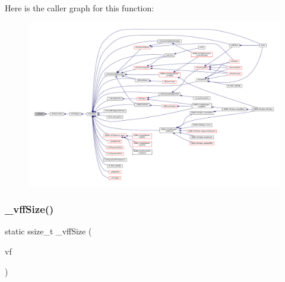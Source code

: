 Here is the caller graph for this function\+:
\nopagebreak
\begin{figure}[H]
\begin{center}
\leavevmode
\includegraphics[width=350pt]{vfs-file_8c_a178c0916210d9b67414652d0df4b291a_icgraph}
\end{center}
\end{figure}
\mbox{\label{vfs-file_8c_af0919c50f70e8df2e12ca7fb437a0b4b}} 
\subsubsection{\texorpdfstring{\+\_\+vff\+Size()}{\_vffSize()}}
{\footnotesize\ttfamily static ssize\+\_\+t \+\_\+vff\+Size (\begin{DoxyParamCaption}\item[{struct V\+File $\ast$}]{vf }\end{DoxyParamCaption})\hspace{0.3cm}{\ttfamily [static]}}


